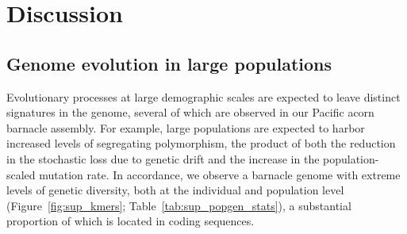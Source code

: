 \section*{Discussion}\label{sec:discussion}

\subsection*{Genome evolution in large populations}

Evolutionary processes at large demographic scales are expected to leave distinct
signatures in the genome, several of which are observed in our Pacific acorn
barnacle assembly.
For example, large populations are expected to harbor increased levels of segregating
polymorphism, the product of both the reduction in the stochastic loss due to
genetic drift and the increase in the population-scaled mutation rate.
In accordance, we observe a barnacle genome with extreme levels of genetic diversity,
both at the individual and population level (Figure~\ref{fig:sup_kmers};
Table~\ref{tab:sup_popgen_stats}), a substantial proportion of which is located in
coding sequences.
\vspace{0.1cm}

